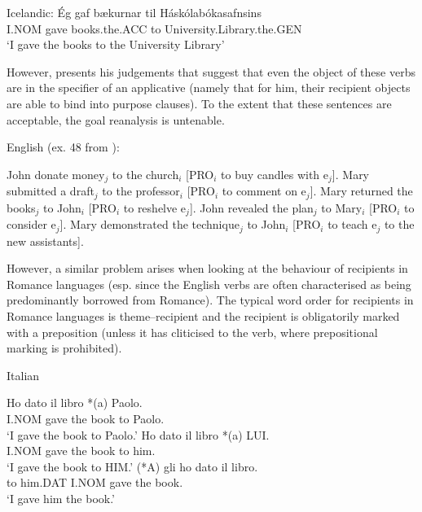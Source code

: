 \begin{exe}
	 Icelandic:
	\gll \'{E}g gaf b\ae kurnar til H\'ask\'olab\'okasafnsins\\
	I.NOM gave books.the.ACC to University.Library.the.GEN\\
	\trans `I gave the books to the University Library'
\end{exe}

However, \cite{Hallman.2015} presents his judgements that suggest that even the object of these verbs are in the specifier of an applicative (namely that for him, their recipient objects are able to bind into purpose clauses). To the extent that these sentences are acceptable, the goal reanalysis is untenable.

\begin{exe}
	\ex English (ex. 48 from \citealt{Hallman.2015}):\label{ex:en-purpose-donate}
	\begin{xlist}
		\ex John donate money$_{j}$ to the church$_{i}$ [PRO$_{i}$ to buy candles with e$_{j}$].
		\ex Mary submitted a draft$_{j}$ to the professor$_{i}$ [PRO$_{i}$ to comment on e$_{j}$].
		\ex Mary returned the books$_{j}$ to John$_{i}$ [PRO$_{i}$ to reshelve e$_{j}$].
		\ex John revealed the plan$_{j}$ to Mary$_{i}$ [PRO$_{i}$ to consider e$_{j}$].
		\ex Mary demonstrated the technique$_{j}$ to John$_{i}$ [PRO$_{i}$ to teach e$_{j}$ to the new assistants].
	\end{xlist}
\end{exe}

However, a similar problem arises when looking at the behaviour of recipients in Romance languages (esp. since the English verbs are often characterised as being predominantly borrowed from Romance). The typical word order for recipients in Romance languages is theme--recipient and the recipient is obligatorily marked with a preposition (unless it has cliticised to the verb, where prepositional marking is prohibited).

\begin{exe}
\ex Italian \citep[sec. 4.3.1]{Proudfoot.2013}
\begin{xlist}
\ex \gll Ho dato il libro *(a) Paolo.\\
I.NOM gave the book to Paolo.\\
\trans `I gave the book to Paolo.'
\ex \gll Ho dato il libro *(a) LUI.\\
I.NOM gave the book to him.\\
\trans `I gave the book to HIM.'
\ex \gll (*A) gli ho dato il libro.\\
to him.DAT I.NOM gave the book.\\
\trans `I gave him the book.'
\end{xlist}
\end{exe}%

